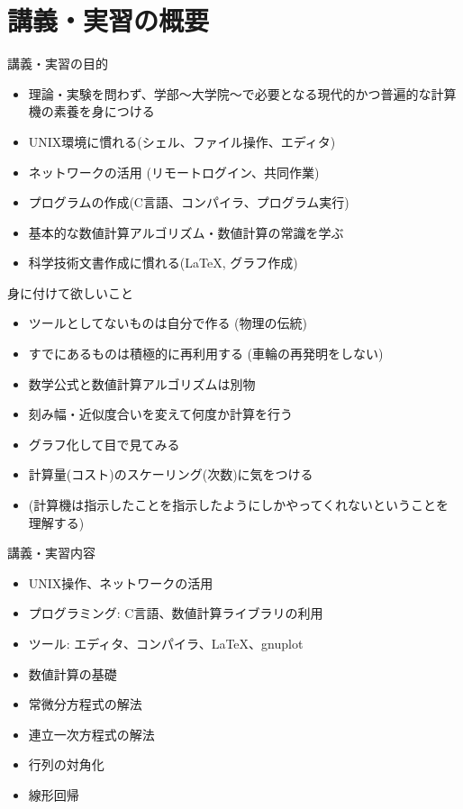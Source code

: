 \section{講義・実習の概要}

\begin{frame}[t]{講義・実習の目的}
  \begin{itemize}
  \item 理論・実験を問わず、学部〜大学院〜で必要となる現代的かつ普遍的な計算機の素養を身につける
  \item UNIX環境に慣れる(シェル、ファイル操作、エディタ)
  \item ネットワークの活用 (リモートログイン、共同作業)
  \item プログラムの作成(C言語、コンパイラ、プログラム実行)
  \item 基本的な数値計算アルゴリズム・数値計算の常識を学ぶ
  \item 科学技術文書作成に慣れる(\LaTeX, グラフ作成)
  \end{itemize}
\end{frame}

\begin{frame}[t]{身に付けて欲しいこと}
  \begin{itemize}
  \item ツールとしてないものは自分で作る (物理の伝統)
  \item すでにあるものは積極的に再利用する (車輪の再発明をしない)
  \item 数学公式と数値計算アルゴリズムは別物
  \item 刻み幅・近似度合いを変えて何度か計算を行う
  \item グラフ化して目で見てみる
  \item 計算量(コスト)のスケーリング(次数)に気をつける
  \item (計算機は指示したことを指示したようにしかやってくれないということを理解する)
  \end{itemize}
\end{frame}

\begin{frame}[t]{講義・実習内容}
  \begin{itemize}
  \item UNIX操作、ネットワークの活用
  \item プログラミング: C言語、数値計算ライブラリの利用
  \item ツール: エディタ、コンパイラ、\LaTeX、gnuplot
  \item 数値計算の基礎
  \item 常微分方程式の解法
  \item 連立一次方程式の解法
  \item 行列の対角化
  \item 線形回帰
  \end{itemize}
\end{frame}

